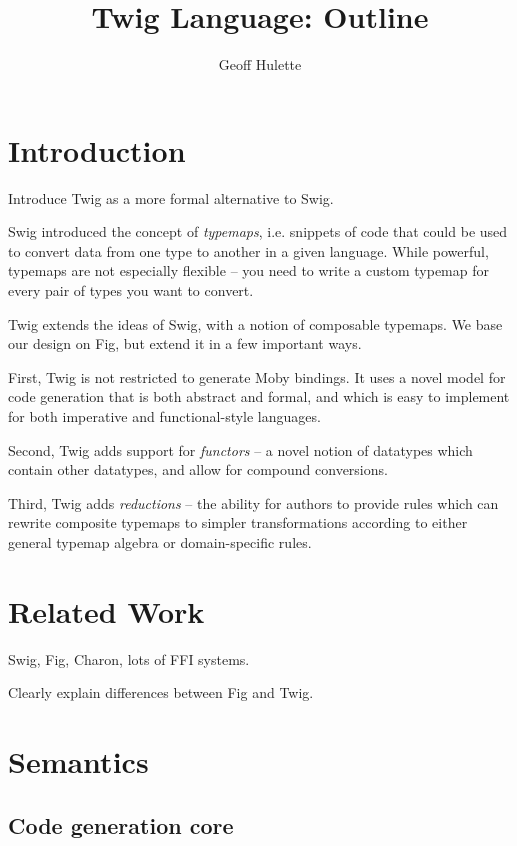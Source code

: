 \documentclass{article}
\begin{document}
\title{Twig Language: Outline}
\author{Geoff Hulette}

\maketitle

\section{Introduction}

Introduce Twig as a more formal alternative to Swig.

Swig introduced the concept of \emph{typemaps}, i.e. snippets of code that could
be used to convert data from one type to another in a given language. While
powerful, typemaps are not especially flexible -- you need to write a custom
typemap for every pair of types you want to convert.

Twig extends the ideas of Swig, with a notion of composable typemaps. We base
our design on Fig, but extend it in a few important ways.

First, Twig is not restricted to generate Moby bindings. It uses a novel model
for code generation that is both abstract and formal, and which is easy to
implement for both imperative and functional-style languages.

Second, Twig adds support for \emph{functors} -- a novel notion of datatypes
which contain other datatypes, and allow for compound conversions.

Third, Twig adds \emph{reductions} -- the ability for authors to provide rules
which can rewrite composite typemaps to simpler transformations according to
either general typemap algebra or domain-specific rules.

\section{Related Work}

Swig, Fig, Charon, lots of FFI systems. 

Clearly explain differences between Fig and Twig.


\section{Semantics}

\subsection{Code generation core}
\end{document}
